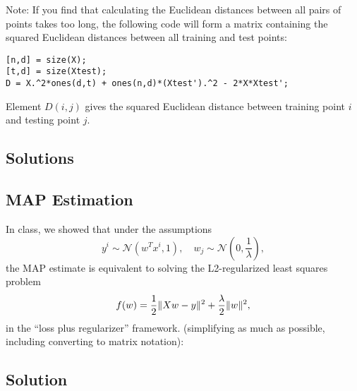 \documentclass{article}
\begin{document}
Note:  If you find that calculating the Euclidean distances between all pairs of points takes too long, the following code will form a matrix containing the squared Euclidean distances between all training and test points:
\begin{verbatim}
[n,d] = size(X);
[t,d] = size(Xtest);
D = X.^2*ones(d,t) + ones(n,d)*(Xtest').^2 - 2*X*Xtest';
\end{verbatim}
Element $D(i,j)$ gives the squared Euclidean distance between training point $i$ and testing point $j$.


\subsection*{Solutions}





\subsection{MAP Estimation}

In class, we showed that under the assumptions
\[
y^i \sim \mathcal{N}(w^Tx^i,1), \quad w_j \sim \mathcal{N}\left(0,\frac{1}{\lambda}\right),
\]
the MAP estimate is equivalent to solving the L2-regularized least squares problem
\[
f(w) = \frac{1}{2}\|Xw - y\|^2 + \frac \lambda 2 \|w\|^2,
\]
in the ``loss plus regularizer'' framework.
 (simplifying as much as possible, including converting to matrix notation):

\subsection*{Solution}
\end{document}
